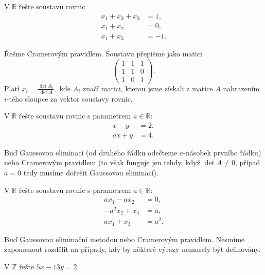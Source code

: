 \begin{priklad}
V $\mathbb R$ řešte  soustavu rovnic
\begin{align*}
    x_1+x_2+x_3 &=1,\\
    x_1+x_2 &= 0,\\
    x_1+x_3 &=-1.
\end{align*}
\end{priklad}

\begin{reseni}
Řešme Cramerovým pravidlem. Soustavu přepišme jako matici
$$
\begin{pmatrix}
    1 & 1&1\\
    1 &1 &0 \\
    1 &0 &1
\end{pmatrix}.
$$
Platí $x_i=\frac{\det A_i}{\det A},$ kde $A_i$ značí matici, kterou jsme získali
z matice $A$ nahrazením $i$-tého sloupce za vektor  soustavy rovnic.
\end{reseni}

\begin{priklad}
V $\mathbb R$ řešte soustavu rovnic s parametrem $a \in \mathbb R$:
\begin{align*}
    x-y &=2,\\
    ax+y &=4.
\end{align*}
\end{priklad}

\begin{reseni}
Buď Gaussovou eliminací (od druhého řádku odečteme $a$-násobek prvního řádku) nebo
Cramerovým pravidlem (to však funguje jen tehdy, když $\det A \ne 0$, případ $a=0$ tedy
musíme dořešit Gaussovou eliminací).
\end{reseni}

\begin{priklad}
V $\mathbb R$ řešte soustavu rovnic s parametrem $a\in \mathbb R$:
\begin{align*}
    ax_1-ax_2 &=0,\\
    -a^2x_2+x_3 &=a,\\
    ax_1 + x_3 &= a^2.
\end{align*}
\end{priklad}

\begin{reseni}
Buď Gaussovou eliminační metodou nebo Cramerovým pravidlem. Nesmíme zapomenout
rozdělit na případy, kdy by některé výrazy nemusely být definovány.
\end{reseni}

\begin{priklad}
V $\mathbb Z$ řešte $5x-13y=2.$
\end{priklad}

